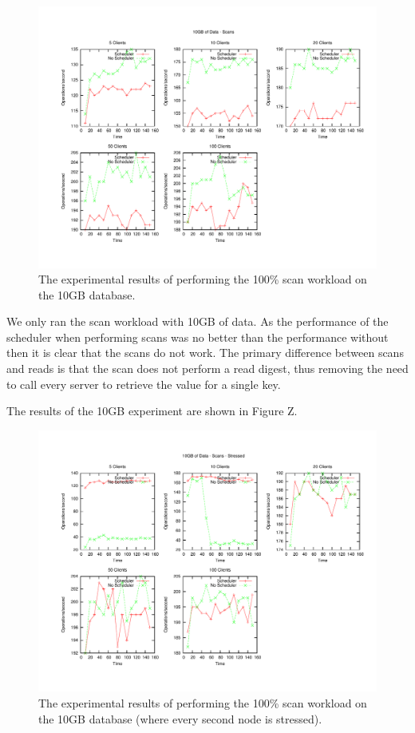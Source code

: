 \documentclass[]{acm_proc_article-sp}
\begin{document}
\begin{figure}[t]
\centering
\includegraphics[scale=0.5]{images/10GB_Scans.pdf}
\vspace{-15pt}
\caption{The experimental results of performing the 100\% scan workload on the 10GB database.}
\label{fig:10g_scans}
\end{figure}

We only ran the scan workload with 10GB of data. As the performance of the scheduler when performing scans was no better than the performance without then it is clear that the scans do not work. The primary difference between scans and reads is that the scan does not perform a read digest, thus removing the need to call every server to retrieve the value for a single key.

The results of the 10GB experiment are shown in Figure Z.

\begin{figure}[t]
\centering
\includegraphics[scale=0.5]{images/10GB_Scans_Stressed.pdf}
\vspace{-15pt}
\caption{The experimental results of performing the 100\% scan workload on the 10GB database (where every second node is stressed).}
\label{fig:10g_scans_stressed}
\end{figure}
\end{document}
